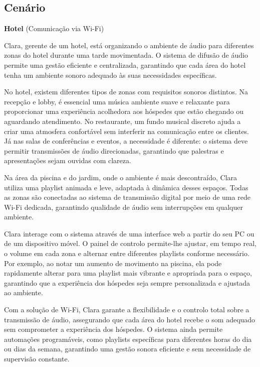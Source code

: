 \documentclass{article}
\begin{document}
\subsection{Cenário}


\textbf{Hotel} (Comunica\c{c}\~ao via Wi-Fi)

Clara, gerente de um hotel, está organizando o ambiente de áudio para diferentes zonas do hotel durante uma tarde movimentada. O sistema de difusão de áudio permite uma gestão eficiente e centralizada, garantindo que cada área do hotel tenha um ambiente sonoro adequado às suas necessidades específicas.

No hotel, existem diferentes tipos de zonas com requisitos sonoros distintos. Na recepção e lobby, é essencial uma música ambiente suave e relaxante para proporcionar uma experiência acolhedora aos hóspedes que estão chegando ou aguardando atendimento. No restaurante, um fundo musical discreto ajuda a criar uma atmosfera confortável sem interferir na comunicação entre os clientes. Já nas salas de conferências e eventos, a necessidade é diferente: o sistema deve permitir transmissões de áudio direcionadas, garantindo que palestras e apresentações sejam ouvidas com clareza.

Na área da piscina e do jardim, onde o ambiente é mais descontraído, Clara utiliza uma playlist animada e leve, adaptada à dinâmica desses espaços. Todas as zonas são conectadas ao sistema de transmissão digital por meio de uma rede Wi-Fi dedicada, garantindo qualidade de áudio sem interrupções em qualquer ambiente.

Clara interage com o sistema através de uma interface web a partir do seu PC ou de um dispositivo móvel. O painel de controlo permite-lhe ajustar, em tempo real, o volume em cada zona e alternar entre diferentes playlists conforme necessário. Por exemplo, ao notar um aumento de movimento na piscina, ela pode rapidamente alterar para uma playlist mais vibrante e apropriada para o espaço, garantindo que a experiência dos hóspedes seja sempre personalizada e ajustada ao ambiente.

Com a solução de Wi-Fi, Clara garante a flexibilidade e o controlo total sobre a transmissão de áudio, assegurando que cada área do hotel recebe o som adequado sem comprometer a experiência dos hóspedes. O sistema ainda permite automações programáveis, como playlists específicas para diferentes horas do dia ou dias da semana, garantindo uma gestão sonora eficiente e sem necessidade de supervisão constante.
\end{document}

